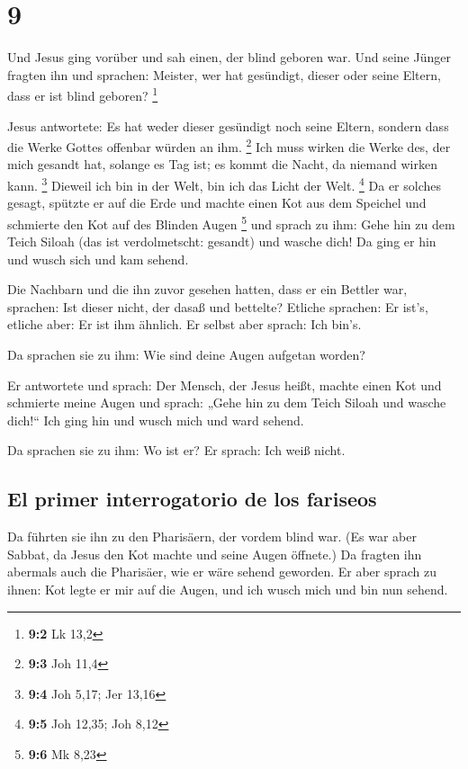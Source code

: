 \hypertarget{section-8}{%
\section{9}\label{section-8}}

 Und Jesus ging vorüber und sah einen, der blind geboren
war.  Und seine Jünger fragten ihn und sprachen: Meister,
wer hat gesündigt, dieser oder seine Eltern, dass er ist blind geboren?
\footnote{\textbf{9:2} Lk 13,2}

 Jesus antwortete: Es hat weder dieser gesündigt noch
seine Eltern, sondern dass die Werke Gottes offenbar würden an ihm.
\footnote{\textbf{9:3} Joh 11,4}  Ich muss wirken die
Werke des, der mich gesandt hat, solange es Tag ist; es kommt die Nacht,
da niemand wirken kann. \footnote{\textbf{9:4} Joh 5,17; Jer 13,16}
 Dieweil ich bin in der Welt, bin ich das Licht der Welt.
\footnote{\textbf{9:5} Joh 12,35; Joh 8,12}  Da er solches
gesagt, spützte er auf die Erde und machte einen Kot aus dem Speichel
und schmierte den Kot auf des Blinden Augen \footnote{\textbf{9:6} Mk
  8,23}  und sprach zu ihm: Gehe hin zu dem Teich Siloah
(das ist verdolmetscht: gesandt) und wasche dich! Da ging er hin und
wusch sich und kam sehend.

 Die Nachbarn und die ihn zuvor gesehen hatten, dass er
ein Bettler war, sprachen: Ist dieser nicht, der dasaß und bettelte?
 Etliche sprachen: Er ist's, etliche aber: Er ist ihm
ähnlich. Er selbst aber sprach: Ich bin's.

 Da sprachen sie zu ihm: Wie sind deine Augen aufgetan
worden?

 Er antwortete und sprach: Der Mensch, der Jesus heißt,
machte einen Kot und schmierte meine Augen und sprach: „Gehe hin zu dem
Teich Siloah und wasche dich!{}`` Ich ging hin und wusch mich und ward
sehend.

 Da sprachen sie zu ihm: Wo ist er? Er sprach: Ich weiß
nicht.

\hypertarget{el-primer-interrogatorio-de-los-fariseos}{%
\subsection{El primer interrogatorio de los
fariseos}\label{el-primer-interrogatorio-de-los-fariseos}}

 Da führten sie ihn zu den Pharisäern, der vordem blind
war.  (Es war aber Sabbat, da Jesus den Kot machte und
seine Augen öffnete.)  Da fragten ihn abermals auch die
Pharisäer, wie er wäre sehend geworden. Er aber sprach zu ihnen: Kot
legte er mir auf die Augen, und ich wusch mich und bin nun sehend.

